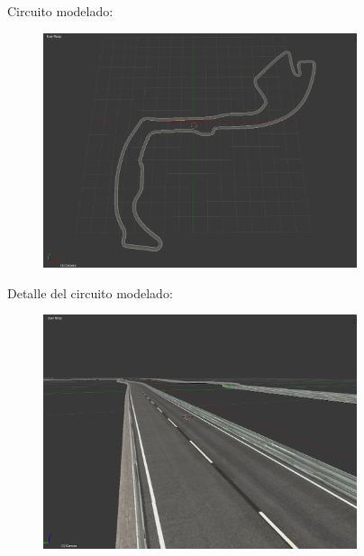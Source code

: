 \documentclass[notes,slidesec,a4]{seminar}
\begin{document}
\begin{hslide}
\begin{minipage}{0.45\textwidth}
	\end{minipage}
\end{hslide}

\begin{hslide}
	\begin{center}
		Circuito modelado:
		\begin{figure}
			\includegraphics[width=0.82\textwidth]{Circuito00.png}
		\end{figure}
	\end{center}
\end{hslide}

\begin{hslide}
	\begin{center}
		Detalle del circuito modelado:
		\begin{figure}
			\includegraphics[width=0.82\textwidth]{Circuito01.png}
		\end{figure}
	\end{center}
\end{hslide}
\end{document}
